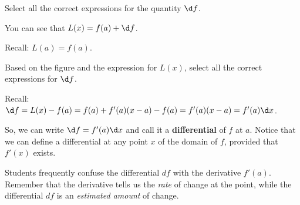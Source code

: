 \documentclass{ximera}
\begin{document}
  \begin{question}
  Select all the correct expressions for the quantity $\d f$.
   \begin{hint}
     You can see that $L(x)=f(a)+\d f$.
    \end{hint}
      \begin{hint}
    Recall: $L(a)=f(a)$.
    \end{hint}
    \begin{selectAll}
    \end{selectAll}
   
  \end{question}

 \begin{question}
Based on  the figure and the expression for $L(x)$, select all the correct expressions for $\d f$.
 \begin{hint}
    Recall: $\d f=L(x)-f(a)=f(a)+f'(a)(x-a)-f(a)=f'(a)(x-a)=f'(a)\d x$.
    \end{hint}
      \begin{selectAll}
      \end{selectAll}
  \end{question}
  
So, we can write $\d f=f'(a)\d x$ and call it a \textbf{differential} of $f$ at $a$. Notice that we can define a differential at any point $x$ of the domain of $f$, provided that $f'(x)$ exists. 

Students frequently confuse the differential $df$ with the derivative $f'(a)$.  Remember that the derivative tells us the
\emph{rate} of change at the point, while the differential $df$ is an \emph{estimated amount} of change.
 
\end{document}
